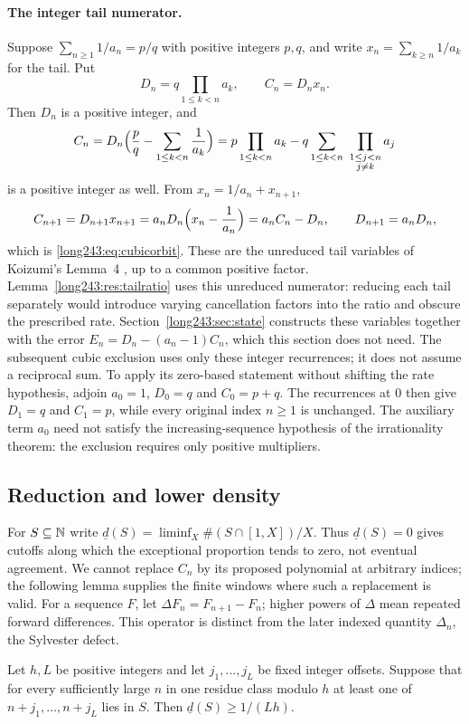 \documentclass[11pt]{article}
\begin{document}
\paragraph{The integer tail numerator.}
Suppose $\sum_{n\ge1}1/a_n=p/q$ with positive integers $p,q$, and write
$x_n=\sum_{k\ge n}1/a_k$ for the tail.  Put
\[
 D_n=q\prod_{1\le k<n}a_k,\qquad C_n=D_nx_n .
\]
Then $D_n$ is a positive integer, and
\[
 C_n=D_n\Bigl(\frac pq-\sum_{1\le k<n}\frac1{a_k}\Bigr)
    =p\prod_{1\le k<n}a_k-q\sum_{1\le k<n}\ \prod_{\substack{1\le j<n\\ j\ne k}}a_j
\]
is a positive integer as well.  From $x_n=1/a_n+x_{n+1}$,
\[
 C_{n+1}=D_{n+1}x_{n+1}=a_nD_n\Bigl(x_n-\frac1{a_n}\Bigr)=a_nC_n-D_n,
 \qquad D_{n+1}=a_nD_n,
\]
which is \eqref{long243:eq:cubicorbit}. These are the unreduced tail variables of Koizumi's
Lemma~4 \cite[pp.~11--12]{koizumi2025}, up to a common positive factor.
Lemma~\ref{long243:res:tailratio} uses this unreduced numerator:
reducing each tail separately would introduce varying cancellation
factors into the ratio and obscure the prescribed rate.
Section~\ref{long243:sec:state} constructs these variables together with
the error $E_n=D_n-(a_n-1)C_n$, which this section does not need.  The subsequent cubic exclusion uses only these integer recurrences;
it does not assume a reciprocal sum. To apply its zero-based statement
without shifting the rate hypothesis, adjoin $a_0=1$, $D_0=q$ and
$C_0=p+q$. The recurrences at $0$ then give $D_1=q$ and $C_1=p$,
while every original index $n\ge1$ is unchanged. The auxiliary term
$a_0$ need not satisfy the increasing-sequence hypothesis of the
irrationality theorem: the exclusion requires only positive multipliers.

\subsection{Reduction and lower density}

For $S\subseteq\mathbb{N}$ write $\underline d(S)=\liminf_X\#(S\cap[1,X])/X$.
Thus $\underline d(S)=0$ gives cutoffs along which the exceptional
proportion tends to zero, not eventual agreement. We cannot replace
$C_n$ by its proposed polynomial at arbitrary indices; the following
lemma supplies the finite windows where such a replacement is valid.
For a sequence $F$, let $\Delta F_n=F_{n+1}-F_n$; higher powers of
$\Delta$ mean repeated forward differences. This operator is distinct
from the later indexed quantity $\Delta_n$, the Sylvester defect.

\begin{lemma}\label{long243:res:periodicobstruction}
Let $h,L$ be positive integers and let $j_1,\ldots,j_L$ be fixed integer
offsets. Suppose that for every sufficiently large $n$ in one residue
class modulo $h$ at least one of $n+j_1,\ldots,n+j_L$ lies in $S$.
Then $\underline d(S)\ge1/(Lh)$.
\end{lemma}
\end{document}
